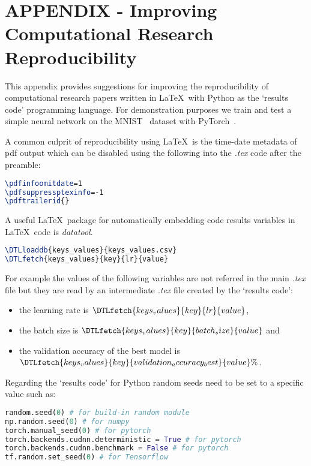 \documentclass[journal]{IEEEtran}
\begin{document}
\section{APPENDIX - Improving Computational Research Reproducibility}
This appendix provides suggestions for improving the reproducibility of computational research papers written in \LaTeX\ with Python as the `results code' programming language.
For demonstration purposes we train and test a simple neural network on the MNIST~\cite{lecun2010mnist} dataset with PyTorch~\cite{paszke2019pytorch}.

A common culprit of reproducibility using \LaTeX\ is the time-date metadata of pdf output which can be disabled using the following into the \textit{.tex} code after the preamble:
\begin{lstlisting}[language=TeX, style=lststyle, caption={\LaTeX\ pdf reproducibility commands for preamble.}, captionpos=b]
\pdfinfoomitdate=1
\pdfsuppressptexinfo=-1
\pdftrailerid{}
\end{lstlisting}

A useful \LaTeX\ package for automatically embedding code results variables in \LaTeX\ code is \textit{datatool}.
\begin{lstlisting}[language=TeX, style=lststyle, caption={\LaTeX\ datatool example of loading a file that contains pairs of keys and values (keys\_values.csv) generated by a `results code' and getting the value of a key named lr.}, captionpos=b]
\DTLloaddb{keys_values}{keys_values.csv}
\DTLfetch{keys_values}{key}{lr}{value}
\end{lstlisting}

For example the values of the following variables are not referred in the main \textit{.tex} file but they are read by an intermediate \textit{.tex} file created by the `results code':
\begin{itemize}
	\item the learning rate is $\DTLfetch{keys_values}{key}{lr}{value}$,
	\item the batch size is $\DTLfetch{keys_values}{key}{batch_size}{value}$ and
	\item the validation accuracy of the best model is $\DTLfetch{keys_values}{key}{validation_accuracy_best}{value}\%$.
\end{itemize}

Regarding the `results code' for Python random seeds need to be set to a specific value such as:
\begin{lstlisting}[language=python, style=lststyle, caption={Python reproducibility commands for some popular libraries.}, captionpos=b]
random.seed(0) # for build-in random module
np.random.seed(0) # for numpy
torch.manual_seed(0) # for pytorch
torch.backends.cudnn.deterministic = True # for pytorch
torch.backends.cudnn.benchmark = False # for pytorch
tf.random.set_seed(0) # for Tensorflow
\end{lstlisting}
\end{document}
